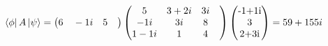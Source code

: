 \documentclass[10pt,a4paper]{article}
\begin{document}
\begin{align}
\bra{\phi}A\ket{\psi}= \begin{pmatrix}
6\quad-1i\quad5\quad\end{pmatrix}\begin{pmatrix}
5&3+2i &3i &\\-1i &3i &8&\\1-1i &1&4&\\\end{pmatrix}\begin{pmatrix}
$-1+1i$\\
$3$\\
$2+3i$\\
\end{pmatrix}=59+155i &\end{align}
\end{document}
